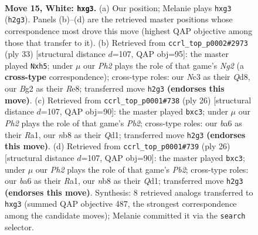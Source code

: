 \documentclass[11pt]{article}
\begin{document}
\clearpage

\begin{figure}[p]\centering
\begin{subfigure}{0.46\textwidth}\centering
\resizebox{\linewidth}{!}{%
\newchessgame
\chessboard[
  setfen={rn1qk2r/p3bp2/b4np1/2pp2N1/8/1PN3p1/P2BPPBP/R2Q1RK1 w kq - 0 15},
  showmover=false,
  pgfstyle=straightmove, color=movearrow, markmove={h2-g3}
]}
\caption{}
\end{subfigure}\hfill
\begin{subfigure}{0.46\textwidth}\centering
\resizebox{\linewidth}{!}{%
\newchessgame
\chessboard[
  setfen={r2qr1k1/pppb1pn1/2np2p1/7P/2P1P2P/2P1BP2/P1N1B3/R2QK2R b KQ - 0 17},
  showmover=false,
  pgfstyle=straightmove, color=movearrow, markmove={g7-h5}
]}
\caption{}
\end{subfigure}
\\[4pt]
\begin{subfigure}{0.46\textwidth}\centering
\resizebox{\linewidth}{!}{%
\newchessgame
\chessboard[
  setfen={r1bqkb1r/p4pp1/3p1n1p/2p5/4PB2/1PpP1N2/1P2N1PP/R2Q1R1K w kq - 0 14},
  showmover=false,
  pgfstyle=straightmove, color=movearrow, markmove={b2-c3}
]}
\caption{}
\end{subfigure}\hfill
\begin{subfigure}{0.46\textwidth}\centering
\resizebox{\linewidth}{!}{%
\newchessgame
\chessboard[
  setfen={r1bqkb1r/p4pp1/3p1n1p/2p5/4PB2/1PpP1N2/1P2N1PP/R2Q1R1K w kq - 0 14},
  showmover=false,
  pgfstyle=straightmove, color=movearrow, markmove={b2-c3}
]}
\caption{}
\end{subfigure}
\caption{\textbf{Move 15, White: \texttt{hxg3}.} (a) Our position; Melanie plays \texttt{hxg3} (\texttt{h2g3}). Panels (b)--(d) are the retrieved master positions whose correspondence most drove this move (highest QAP objective among those that transfer to it). (b) Retrieved from \texttt{ccrl\_top\_p0002\#2973} (ply 33) [structural distance $d$=107, QAP obj=95]: the master played \texttt{Nxh5}; under $\mu$ our \emph{Ph2} plays the role of that game's \emph{Ng2} (a \textbf{cross-type} correspondence); cross-type roles: our \emph{N}c3 as their \emph{Q}d8, our \emph{B}g2 as their \emph{R}e8; transferred move \texttt{h2g3} \textbf{(endorses this move)}. (c) Retrieved from \texttt{ccrl\_top\_p0001\#738} (ply 26) [structural distance $d$=107, QAP obj=90]: the master played \texttt{bxc3}; under $\mu$ our \emph{Ph2} plays the role of that game's \emph{Pb2}; cross-type roles: our \emph{b}a6 as their \emph{R}a1, our \emph{n}b8 as their \emph{Q}d1; transferred move \texttt{h2g3} \textbf{(endorses this move)}. (d) Retrieved from \texttt{ccrl\_top\_p0001\#739} (ply 26) [structural distance $d$=107, QAP obj=90]: the master played \texttt{bxc3}; under $\mu$ our \emph{Ph2} plays the role of that game's \emph{Pb2}; cross-type roles: our \emph{b}a6 as their \emph{R}a1, our \emph{n}b8 as their \emph{Q}d1; transferred move \texttt{h2g3} \textbf{(endorses this move)}. Synthesis: 8 retrieved analogs transferred to \texttt{hxg3} (summed QAP objective 487, the strongest correspondence among the candidate moves); Melanie committed it via the \texttt{search} selector.}
\label{fig:thought-m28}
\end{figure}
\end{document}
